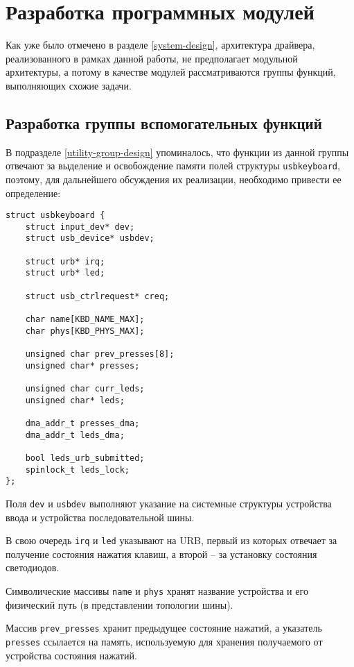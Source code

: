 \section{Разработка программных модулей}

Как уже было отмечено в разделе \ref{system-design},
архитектура драйвера, реализованного в рамках данной работы,
не предполагает модульной архитектуры, а потому в качестве модулей
рассматриваются группы функций, выполняющих схожие задачи.

\subsection{Разработка группы вспомогательных функций}

В подразделе \ref{utility-group-design} упоминалось, что функции из данной
группы отвечают за выделение и освобождение памяти полей структуры \texttt{usbkeyboard},
поэтому, для дальнейшего обсуждения их реализации, необходимо привести ее определение:
\begin{verbatim}
struct usbkeyboard {
    struct input_dev* dev;
    struct usb_device* usbdev;

    struct urb* irq;
    struct urb* led;

    struct usb_ctrlrequest* creq;

    char name[KBD_NAME_MAX];
    char phys[KBD_PHYS_MAX];

    unsigned char prev_presses[8];
    unsigned char* presses;

    unsigned char curr_leds;
    unsigned char* leds;    

    dma_addr_t presses_dma;
    dma_addr_t leds_dma;

    bool leds_urb_submitted;
    spinlock_t leds_lock;
};
\end{verbatim}

Поля \texttt{dev} и \texttt{usbdev} выполняют указание на системные структуры
устройства ввода и устройства последовательной шины.

В свою очередь \texttt{irq} и \texttt{led} указывают на URB, первый из которых
отвечает за получение состояния нажатия клавиш, 
а второй -- за установку состояния светодиодов.

Символические массивы \texttt{name} и \texttt{phys} хранят название устройства
и его физический путь (в представлении топологии шины).

Массив \texttt{prev\_presses} хранит предыдущее состояние нажатий,
а указатель \texttt{presses} ссылается на память, используемую для хранения
получаемого от устройства состояния нажатий.

